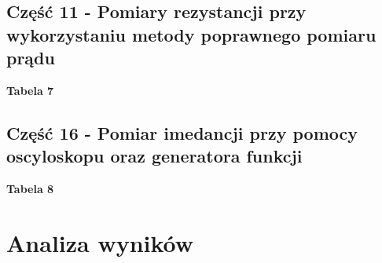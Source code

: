 \documentclass[11pt]{article}
\begin{document}
    \subsection*{Część 11 - Pomiary rezystancji przy wykorzystaniu metody poprawnego pomiaru prądu}
    \begin{center}
        \small{\textbf{Tabela 7}}
    \end{center}
    \begin{adjustwidth}{-10pt}{}
        \begin{center}
        \end{center}
    \end{adjustwidth}
    \newpage
    \subsection*{Część 16 - Pomiar imedancji przy pomocy oscyloskopu oraz generatora funkcji}
    \begin{center}
        \small{\textbf{Tabela 8}}
    \end{center}
    \begin{center}
    \end{center}

    \section{Analiza wyników}
\end{document}
